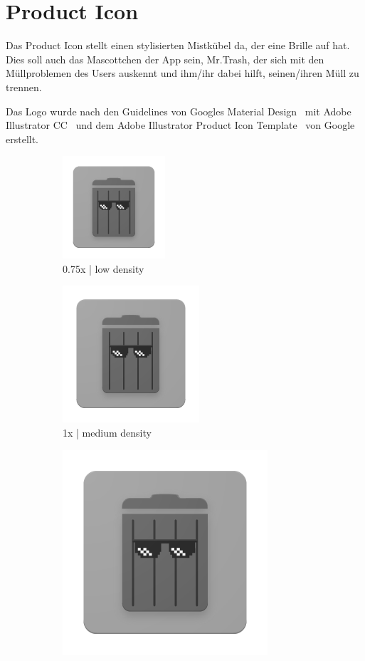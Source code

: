 \documentclass[12pt, a4paper]{scrreprt}
\begin{document}
\newpage
\section{Product Icon}

Das Product Icon stellt einen stylisierten Mistkübel da, der eine Brille auf hat. Dies soll auch das Mascottchen der App sein, Mr.Trash, der sich mit den Müllproblemen des Users auskennt und ihm/ihr dabei hilft, seinen/ihren Müll zu trennen.

Das Logo wurde nach den Guidelines von Googles Material Design~\cite{materialproductguideline} mit Adobe Illustrator CC~\cite{adobeillustrator} und dem Adobe Illustrator Product Icon Template~\cite{stickersheets} von Google erstellt.

\begin{figure}[h]
\centering
\begin{subfigure}{.3\textwidth}
  \centering
  \includegraphics[width=.1875\linewidth]{../graphical/icon/0.75x/ic_material_product_icon_192pxldpi.png}
  \caption{0.75x | low density}
  \label{fig:075}
\end{subfigure}%
\begin{subfigure}{.3\textwidth}
  \centering
  \includegraphics[width=0.25\linewidth]{../graphical/icon/1x/ic_material_product_icon_192pxmdpi.png}
  \caption{1x | medium density}
  \label{fig:1}
\end{subfigure}%
\begin{subfigure}{.3\textwidth}
  \centering
  \includegraphics[width=0.375\linewidth]{../graphical/icon/1.5x/ic_material_product_icon_192pxhdpi.png}

\end{subfigure}
\end{figure}
\end{document}
